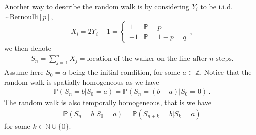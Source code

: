 \documentclass[11pt, onesided]{book}
\theoremstyle{break}
\theoremstyle{break}
\newcommand{\N}{\mathbb{N}}
\newcommand{\Z}{\mathbb{Z}}
\begin{document}
Another way to describe the random walk is by considering $Y_i$ to be i.i.d. $\sim \text{Bernoulli}[p]$, 
$$X_i = 2Y_i - 1 = \begin{cases}
1 & \mathbb{P}=p\\
-1 &\mathbb{P} = 1-p=q
\end{cases}\,,
$$
we then denote
\begin{align*}
S_n = \sum_{j=1}^n X_j = \text{location of the walker on the line after $n$ steps.}
\end{align*}
Assume here $S_0 = a$ being the initial condition, for some $a \in \Z$.
Notice that the random walk is spatially homogeneous as we have
\begin{align*}
\mathbb{P}(S_n=b | S_0 =a) = \mathbb{P}(S_n = (b-a) | S_0 = 0)\,.
\end{align*}
The random walk is also temporally homogeneous, that is we have
\begin{align*}
\mathbb{P}(S_n = b| S_0 =a) = \mathbb{P}(S_{n+k} = b | S_k=a)
\end{align*}
for some $k\in \N \cup\{0\}$. \\
\end{document}
